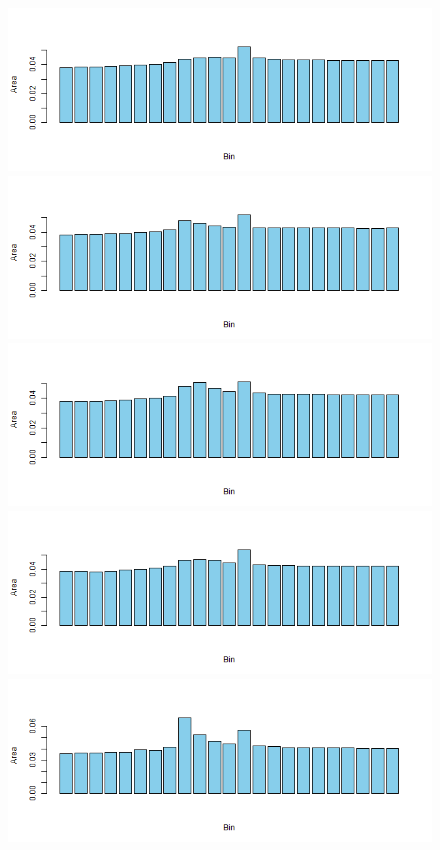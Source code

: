 \documentclass[11pt]{article}
\theoremstyle{plain}
\theoremstyle{definition}
\begin{document}
\begin{figure}[H]
\begin{center}
\includegraphics[trim ={3.5cm 2.7cm 2cm 2cm},scale=.6, clip=true]{Binned_Areas17.png}
\includegraphics[trim ={3.5cm 2.7cm 2cm 2cm},scale=.6, clip=true]{Binned_Areas18.png}
\includegraphics[trim ={3.5cm 2.7cm 2cm 2cm},scale=.6, clip=true]{Binned_Areas19.png}
\includegraphics[trim ={3.5cm 2.7cm 2cm 2cm},scale=.6, clip=true]{Binned_Areas20.png}
\includegraphics[trim ={3.5cm 2.7cm 2cm 2cm},scale=.6, clip=true]{Binned_Areas21.png}

\end{center}
\end{figure}
\end{document}
